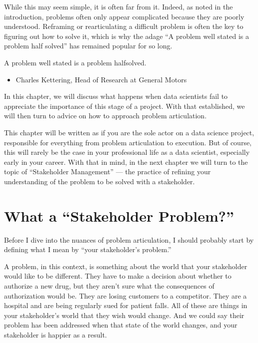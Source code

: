 \documentclass[letterpaper,10pt,english]{jupyterBook}
\begin{document}
\sphinxAtStartPar
While this may seem simple, it is often far from it. Indeed, as noted in the introduction, problems often only appear complicated because they are poorly understood. Reframing or rearticulating a difficult problem is often the key to figuring out how to solve it, which is why the adage “A problem well stated is a problem half solved” has remained popular for so long.

\begin{sphinxShadowBox}

\sphinxAtStartPar
A problem well stated is a problem half\sphinxhyphen{}solved.
\begin{itemize}
\item {} 
\sphinxAtStartPar
Charles Kettering, Head of Research at General Motors

\end{itemize}
\end{sphinxShadowBox}

\sphinxAtStartPar
In this chapter, we will discuss what happens when data scientists fail to appreciate the importance of this stage of a project. With that established, we will then turn to advice on how to approach problem articulation.

\sphinxAtStartPar
This chapter will be written as if you are the sole actor on a data science project, responsible for everything from problem articulation to execution. But of course, this will rarely be the case in your professional life as a data scientist, especially early in your career. With that in mind, in the next chapter we will turn to the topic of “Stakeholder Management” — the practice of refining your understanding of the problem to be solved with a stakeholder.


\section{What  a “Stakeholder Problem?”}
\label{\detokenize{20_problems_to_questions/10_solving_the_right_problem:what-is-a-stakeholder-problem}}
\sphinxAtStartPar
Before I dive into the nuances of problem articulation, I should probably start by defining what I mean by “your stakeholder’s problem.”

\sphinxAtStartPar
A problem, in this context, is something about the world that your stakeholder would like to be different. They have to make a decision about whether to authorize a new drug, but they aren’t sure what the consequences of authorization would be. They are losing customers to a competitor. They are a hospital and are being regularly sued for patient falls. All of these are things in your stakeholder’s world that they wish would change. And we could say their problem has been addressed when that state of the world changes, and your stakeholder is happier as a result.
\end{document}
